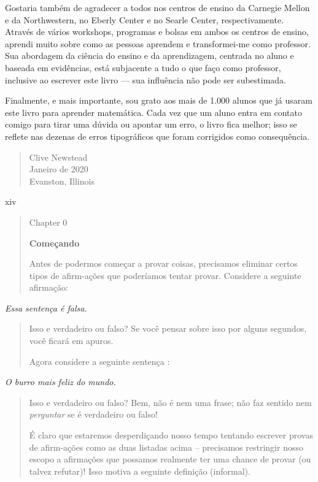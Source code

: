 \documentclass[
]{article}
\begin{document}
Gostaria também de agradecer a todos nos centros de ensino da Carnegie
Mellon e da Northwestern, no Eberly Center e no Searle Center,
respectivamente. Através de vários workshops, programas e bolsas em
ambos os centros de ensino, aprendi muito sobre como as pessoas aprendem
e transformei-me como professor. Sua abordagem da ciência do ensino e da
aprendizagem, centrada no aluno e baseada em evidências, está subjacente
a tudo o que faço como professor, inclusive ao escrever este livro ---
sua influência não pode ser subestimada.

Finalmente, e mais importante, sou grato aos mais de 1.000 alunos que já
usaram este livro para aprender matemática. Cada vez que um aluno entra
em contato comigo para tirar uma dúvida ou apontar um erro, o livro fica
melhor; isso se reflete nas dezenas de erros tipográficos que foram
corrigidos como consequência.

\begin{quote}
Clive Newstead\\
Janeiro de 2020\\
Evanston, Illinois
\end{quote}

xiv

\begin{quote}
Chapter 0

\textbf{Começando}

Antes de podermos começar a provar coisas, precisamos eliminar certos
tipos de afirm-ações que poderíamos tentar provar. Considere a seguinte
afirmação:
\end{quote}

\emph{Essa sentença é falsa.}

\begin{quote}
Isso e verdadeiro ou falso? Se você pensar sobre isso por alguns
segundos, você ficará em apuros.

Agora considere a seguinte sentença :
\end{quote}

\emph{O burro mais feliz do mundo.}

\begin{quote}
Isso e verdadeiro ou falso? Bem, não é nem uma frase; não faz sentido
nem \emph{perguntar} se é verdadeiro ou falso!

É claro que estaremos desperdiçando nosso tempo tentando escrever provas
de afirm-ações como as duas listadas acima -- precisamos restringir
nosso escopo a afirmações que possamos realmente ter uma chance de
provar (ou talvez refutar)! Isso motiva a seguinte definição (informal).
\end{quote}
\end{document}
